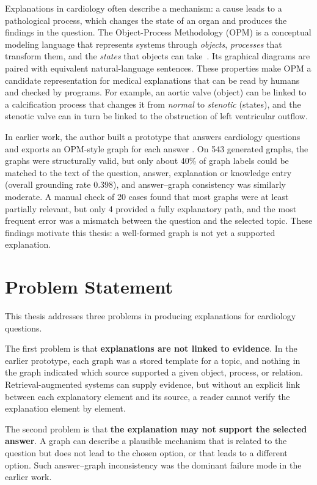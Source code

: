 Explanations in cardiology often describe a mechanism: a cause leads to a pathological process, which changes the state of an organ and produces the findings in the question. The Object-Process Methodology (OPM) is a conceptual modeling language that represents systems through \emph{objects}, \emph{processes} that transform them, and the \emph{states} that objects can take~\cite{dori_opm_2016,iso_19450_2015}. Its graphical diagrams are paired with equivalent natural-language sentences. These properties make OPM a candidate representation for medical explanations that can be read by humans and checked by programs. For example, an aortic valve (object) can be linked to a calcification process that changes it from \emph{normal} to \emph{stenotic} (states), and the stenotic valve can in turn be linked to the obstruction of left ventricular outflow.

In earlier work, the author built a prototype that answers cardiology questions and exports an OPM-style graph for each answer . On 543 generated graphs, the graphs were structurally valid, but only about 40\% of graph labels could be matched to the text of the question, answer, explanation or knowledge entry (overall grounding rate 0.398), and answer--graph consistency was similarly moderate. A manual check of 20 cases found that most graphs were at least partially relevant, but only 4 provided a fully explanatory path, and the most frequent error was a mismatch between the question and the selected topic. These findings motivate this thesis: a well-formed graph is not yet a supported explanation.

\section{Problem Statement}
\label{sec:problem_statement}

This thesis addresses three problems in producing explanations for cardiology questions.

The first problem is that \textbf{explanations are not linked to evidence}. In the earlier prototype, each graph was a stored template for a topic, and nothing in the graph indicated which source supported a given object, process, or relation. Retrieval-augmented systems can supply evidence, but without an explicit link between each explanatory element and its source, a reader cannot verify the explanation element by element.

The second problem is that \textbf{the explanation may not support the selected answer}. A graph can describe a plausible mechanism that is related to the question but does not lead to the chosen option, or that leads to a different option. Such answer--graph inconsistency was the dominant failure mode in the earlier work.


